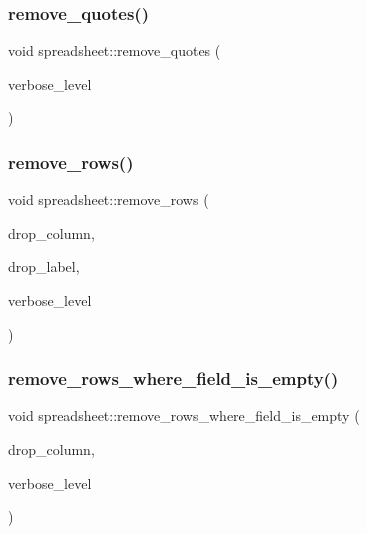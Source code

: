 \mbox{\label{classspreadsheet_a35daf3aff9d9d042bca05e2ebaf4ec84}} 
\subsubsection{\texorpdfstring{remove\+\_\+quotes()}{remove\_quotes()}}
{\footnotesize\ttfamily void spreadsheet\+::remove\+\_\+quotes (\begin{DoxyParamCaption}\item[{\mbox{\hyperlink{galois_8h_a09fddde158a3a20bd2dcadb609de11dc}{I\+NT}}}]{verbose\+\_\+level }\end{DoxyParamCaption})}

\mbox{\label{classspreadsheet_a1c8aeaa2284bf61c8ca2ca58ec04e73f}} 
\subsubsection{\texorpdfstring{remove\+\_\+rows()}{remove\_rows()}}
{\footnotesize\ttfamily void spreadsheet\+::remove\+\_\+rows (\begin{DoxyParamCaption}\item[{const \mbox{\hyperlink{galois_8h_ab6cc7b4aeb6ea31aba2b3fbfc83ff5e6}{B\+Y\+TE}} $\ast$}]{drop\+\_\+column,  }\item[{const \mbox{\hyperlink{galois_8h_ab6cc7b4aeb6ea31aba2b3fbfc83ff5e6}{B\+Y\+TE}} $\ast$}]{drop\+\_\+label,  }\item[{\mbox{\hyperlink{galois_8h_a09fddde158a3a20bd2dcadb609de11dc}{I\+NT}}}]{verbose\+\_\+level }\end{DoxyParamCaption})}

\mbox{\label{classspreadsheet_a7d63405ab5c5ac22c86449e5ca5d5be1}} 
\subsubsection{\texorpdfstring{remove\+\_\+rows\+\_\+where\+\_\+field\+\_\+is\+\_\+empty()}{remove\_rows\_where\_field\_is\_empty()}}
{\footnotesize\ttfamily void spreadsheet\+::remove\+\_\+rows\+\_\+where\+\_\+field\+\_\+is\+\_\+empty (\begin{DoxyParamCaption}\item[{const \mbox{\hyperlink{galois_8h_ab6cc7b4aeb6ea31aba2b3fbfc83ff5e6}{B\+Y\+TE}} $\ast$}]{drop\+\_\+column,  }\item[{\mbox{\hyperlink{galois_8h_a09fddde158a3a20bd2dcadb609de11dc}{I\+NT}}}]{verbose\+\_\+level }\end{DoxyParamCaption})}

